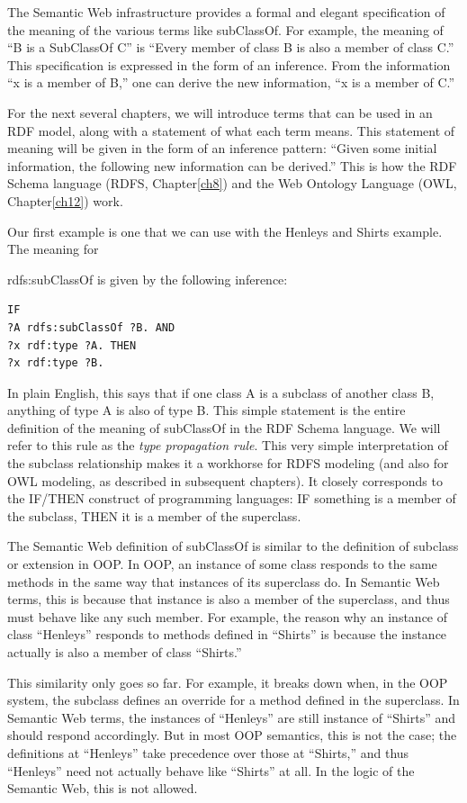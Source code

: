 The Semantic Web infrastructure provides a formal and elegant
specification of the meaning of the various terms like subClassOf. For
example, the meaning of ``B is a SubClassOf C'' is ``Every member of
class B is also a member of class C.'' This specification is expressed
in the form of an inference. From the information ``x is a member of
B,'' one can derive the new information, ``x is a member of C.''

For the next several chapters, we will introduce terms that can be used
in an RDF model, along with a statement of what each term means. This
statement of meaning will be given in the form of an inference pattern:
``Given some initial information, the following new information can be
derived.'' This is how the RDF Schema language (RDFS, Chapter\ref{ch8}) and the
Web Ontology Language (OWL, Chapter\ref{ch12}) work.

Our first example is one that we can use with the Henleys and Shirts
example. The meaning for

rdfs:subClassOf is given by the following inference:

\begin{lstlisting}
IF
?A rdfs:subClassOf ?B. AND
?x rdf:type ?A. THEN
?x rdf:type ?B.
\end{lstlisting}

In plain English, this says that if one class A is a subclass of another
class B, anything of type A is also of type B. This simple statement is
the entire definition of the meaning of subClassOf in the RDF Schema
language. We will refer to this rule as the \emph{type propagation
rule}. This very simple interpretation of the subclass relationship
makes it a workhorse for RDFS modeling (and also for OWL modeling, as
described in subsequent chapters). It closely corresponds to the IF/THEN
construct of programming languages: IF something is a member of the
subclass, THEN it is a member of the superclass.

\begin{sidebar}{}
The Semantic Web definition of subClassOf is similar to the definition
of subclass or extension in OOP. In OOP, an instance of some class
responds to the same methods in the same way that instances of its
superclass do. In Semantic Web terms, this is because that instance is
also a member of the superclass, and thus must behave like any such
member. For example, the reason why an instance of class ``Henleys''
responds to methods defined in ``Shirts'' is because the instance
actually is also a member of class ``Shirts.''

This similarity only goes so far. For example, it breaks down when, in
the OOP system, the subclass defines an override for a method defined in
the superclass. In Semantic Web terms, the instances of ``Henleys'' are
still instance of ``Shirts'' and should respond accordingly. But in most
OOP semantics, this is not the case; the definitions at ``Henleys'' take
precedence over those at ``Shirts,'' and thus ``Henleys'' need not
actually behave like ``Shirts'' at all. In the logic of the Semantic
Web, this is not allowed.
\end{sidebar}

